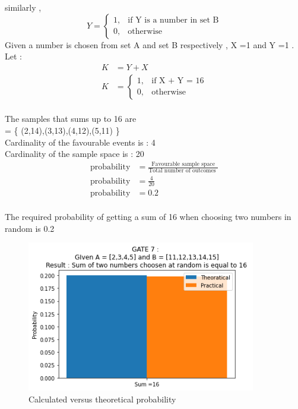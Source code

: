 \documentclass[journal,12pt,twocolumn]{IEEEtran}
\begin{document}
similarly ,\\
\[
    Y = 
\begin{cases}
    1,& \text{if Y is a number in set B}  \\
    0,              & \text{otherwise}
\end{cases}
\]
Given a number is chosen from set A and set B respectively , X =1 and Y =1 . Let : \\
\begin{align}
K  &= Y + X\\
K  &= 
\begin{cases}
1,& \text{if X + Y = 16}  \\
0,              & \text{otherwise}
\end{cases}
\end{align}
\\
The samples that sums up to 16 are \\
= \{ (2,14),(3,13),(4,12),(5,11) \}\\
\smallskip
Cardinality of the favourable events is : 4\\
Cardinality of the sample space is : 20\\
\smallskip
\begin{align}
\text{probability} &= \frac{\text{Favourable sample space}}{\text{Total number of outcomes }}\\
\text{probability} &= \frac{4}{20}\\
\text{probability} &= 0.2
\end{align}
\\
The required probability of getting a sum of 16 when choosing two numbers in random is 0.2 \\
\smallskip

\begin{figure}[htp]
    \centering
    \includegraphics[width=10cm]{Assignemnt_8}
    \caption{Calculated versus theoretical probability}
    \label{fig :plot}
\end{figure}

\vfill
\end{document}
